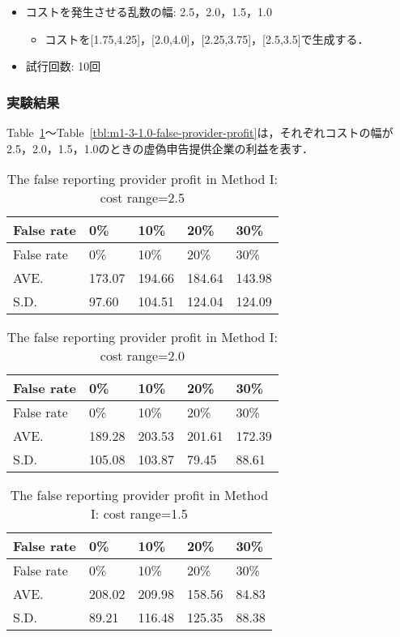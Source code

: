 \begin{itemize}
\tightlist
\item
  コストを発生させる乱数の幅: 2.5，2.0，1.5，1.0

  \begin{itemize}
  \tightlist
  \item
    コストを{[}1.75,4.25{]}，{[}2.0,4.0{]}，{[}2.25,3.75{]}，{[}2.5,3.5{]}で生成する．
  \end{itemize}
\item
  試行回数: 10回
\end{itemize}

\hypertarget{ux5b9fux9a13ux7d50ux679c-1}{%
\subsubsection{実験結果}\label{ux5b9fux9a13ux7d50ux679c-1}}

Table~\ref{tbl:m1-3-2.5-false-provider-profit}〜Table~\ref{tbl:m1-3-1.0-false-provider-profit}は，それぞれコストの幅が2.5，2.0，1.5，1.0のときの虚偽申告提供企業の利益を表す．

\hypertarget{tbl:m1-3-2.5-false-provider-profit}{}
\begin{longtable}[H]{@{}lllll@{}}
\caption{\label{tbl:m1-3-2.5-false-provider-profit}The false reporting
provider profit in Method I: cost range=2.5}\tabularnewline
\toprule
False rate & 0\% & 10\% & 20\% & 30\%\tabularnewline
\midrule
\endfirsthead
\toprule
False rate & 0\% & 10\% & 20\% & 30\%\tabularnewline
\midrule
\endhead
AVE. & 173.07 & 194.66 & 184.64 & 143.98\tabularnewline
S.D. & 97.60 & 104.51 & 124.04 & 124.09\tabularnewline
\bottomrule
\end{longtable}

\hypertarget{tbl:m1-3-2.0-false-provider-profit}{}
\begin{longtable}[H]{@{}lllll@{}}
\caption{\label{tbl:m1-3-2.0-false-provider-profit}The false reporting
provider profit in Method I: cost range=2.0}\tabularnewline
\toprule
False rate & 0\% & 10\% & 20\% & 30\%\tabularnewline
\midrule
\endfirsthead
\toprule
False rate & 0\% & 10\% & 20\% & 30\%\tabularnewline
\midrule
\endhead
AVE. & 189.28 & 203.53 & 201.61 & 172.39\tabularnewline
S.D. & 105.08 & 103.87 & 79.45 & 88.61\tabularnewline
\bottomrule
\end{longtable}

\hypertarget{tbl:m1-3-1.5-false-provider-profit}{}
\begin{longtable}[H]{@{}lllll@{}}
\caption{\label{tbl:m1-3-1.5-false-provider-profit}The false reporting
provider profit in Method I: cost range=1.5}\tabularnewline
\toprule
False rate & 0\% & 10\% & 20\% & 30\%\tabularnewline
\midrule
\endfirsthead
\toprule
False rate & 0\% & 10\% & 20\% & 30\%\tabularnewline
\midrule
\endhead
AVE. & 208.02 & 209.98 & 158.56 & 84.83\tabularnewline
S.D. & 89.21 & 116.48 & 125.35 & 88.38\tabularnewline
\bottomrule
\end{longtable}

